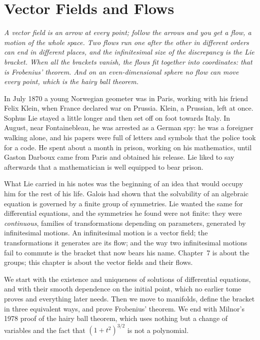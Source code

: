 \chapter{Vector Fields and Flows}

\begin{center}\itshape
A vector field is an arrow at every point; follow the arrows and you get a flow, a motion of the whole space. Two flows run one after the other in
different orders can end in different places, and the infinitesimal size of the discrepancy is the Lie bracket. When all the brackets vanish, the flows
fit together into coordinates: that is Frobenius' theorem. And on an even-dimensional sphere no flow can move every point, which is the hairy ball
theorem.
\end{center}

In July 1870 a young Norwegian geometer was in Paris, working with his friend Felix Klein, when France declared war on Prussia. Klein, a Prussian, left at
once. Sophus Lie stayed a little longer and then set off on foot towards Italy. In August, near Fontainebleau, he was arrested as a German spy: he was a
foreigner walking alone, and his papers were full of letters and symbols that the police took for a code. He spent about a month in prison, working on
his mathematics, until Gaston Darboux came from Paris and obtained his release. Lie liked to say afterwards that a mathematician is well equipped to
bear prison.

What Lie carried in his notes was the beginning of an idea that would occupy him for the rest of his life. Galois had shown that the solvability of an
algebraic equation is governed by a finite group of symmetries. Lie wanted the same for differential equations, and the symmetries he found were not
finite: they were \emph{continuous}, families of transformations depending on parameters, generated by infinitesimal motions. An infinitesimal motion
is a vector field; the transformations it generates are its flow; and the way two infinitesimal motions fail to commute is the bracket that now bears
his name. Chapter~7 is about the groups; this chapter is about the vector fields and their flows.

We start with the existence and uniqueness of solutions of differential equations, and with their smooth dependence on the initial point, which no
earlier tome proves and everything later needs. Then we move to manifolds, define the bracket in three equivalent ways, and prove Frobenius' theorem.
We end with Milnor's 1978 proof of the hairy ball theorem, which uses nothing but a change of variables and the fact that $(1+t^2)^{3/2}$ is not a
polynomial.

